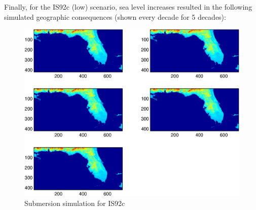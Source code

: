 \documentclass[12pt,a4paper,titlepage]{article}
\begin{document}
Finally, for the IS92c (low) scenario, sea level increases
resulted in the following simulated geographic consequences (shown
every decade for 5 decades):
\begin{figure}[!htb]
\centering
\includegraphics[width=1\textwidth]{fig09.eps} \caption{Submersion simulation for IS92c}
\end{figure}

\newpage
\end{document}
